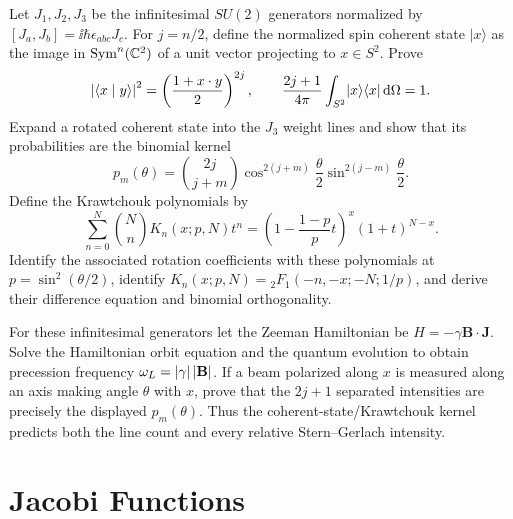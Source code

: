\begin{exercise}
Let $J_1,J_2,J_3$ be the infinitesimal $SU(2)$ generators normalized by
$[J_a,J_b]=\ii\hbar\epsilon_{abc}J_c$.  For $j=n/2$, define the normalized
spin coherent state $\lvert x\rangle$ as
the image in $\operatorname{Sym}^n(\mathbb C^2)$ of a unit vector projecting to
$x\in S^2$.  Prove
\[
 \left\lvert \langle x\mid y\rangle\right\rvert^2=\left(\frac{1+x\cdot y}{2}\right)^{2j},
 \qquad
 \frac{2j+1}{4\pi}\int_{S^2}\lvert x\rangle\langle x\rvert\,\mathrm d\Omega=1.
\]
Expand a rotated coherent state into the $J_3$ weight lines and show that its
probabilities are the binomial kernel
\[
 p_m(\theta)=\binom{2j}{j+m}
 \cos^{2(j+m)}\frac\theta2\sin^{2(j-m)}\frac\theta2.
\]
Define the Krawtchouk polynomials by
\[
 \sum_{n=0}^N\binom NnK_n(x;p,N)t^n
 =\left(1-\frac{1-p}{p}t\right)^x(1+t)^{N-x}.
\]
Identify the associated rotation coefficients with these polynomials at
$p=\sin^2(\theta/2)$, identify
$K_n(x;p,N)={}_2F_1(-n,-x;-N;1/p)$, and derive their difference equation and
binomial orthogonality.
\end{exercise}

\begin{exercise}
For these infinitesimal generators let the Zeeman Hamiltonian be
$H=-\gamma\mathbf B\cdot\mathbf J$.  Solve the Hamiltonian orbit equation and
the quantum evolution to obtain precession frequency
$\omega_L=\left\lvert \gamma\right\rvert\left\lvert \mathbf B\right\rvert$.  If a beam polarized along $x$ is
measured along an axis making angle $\theta$ with $x$, prove that the
$2j+1$ separated intensities are precisely the displayed $p_m(\theta)$.  Thus the
coherent-state/Krawtchouk kernel predicts both the line count and every
relative Stern--Gerlach intensity.
\end{exercise}

\section{Jacobi Functions}

